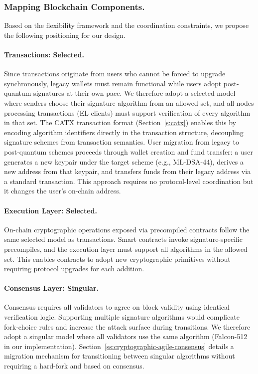 \subsubsection{Mapping Blockchain Components.}\label{subsubsec:mapping-components}

Based on the flexibility framework and the coordination constraints, we propose the following positioning for our design.

\paragraph{Transactions: Selected.}\label{para:transaction-selected}
Since transactions originate from users who cannot be forced to upgrade synchronously, legacy wallets must remain functional while users adopt post-quantum signatures at their own pace.
We therefore adopt a selected model where senders choose their signature algorithm from an allowed set, and all nodes processing transactions (EL clients) must support verification of every algorithm in that set.
The CATX transaction format (Section~\ref{s:catx}) enables this by encoding algorithm identifiers directly in the transaction structure, decoupling signature schemes from transaction semantics.
User migration from legacy to post-quantum schemes proceeds through wallet creation and fund transfer: a user generates a new keypair under the target scheme (e.g., ML-DSA-44), derives a new address from that keypair, and transfers funds from their legacy address via a standard transaction.
This approach requires no protocol-level coordination but it changes the user's on-chain address.

\paragraph{Execution Layer: Selected.}\label{para:execution-selected}
On-chain cryptographic operations exposed via precompiled contracts follow the same selected model as transactions.
Smart contracts invoke signature-specific precompiles, and the execution layer must support all algorithms in the allowed set.
This enables contracts to adopt new cryptographic primitives without requiring protocol upgrades for each addition.

\paragraph{Consensus Layer: Singular.}\label{para:consensus-singular}
Consensus requires all validators to agree on block validity using identical verification logic.
Supporting multiple signature algorithms would complicate fork-choice rules and increase the attack surface during transitions.
We therefore adopt a singular model where all validators use the same algorithm (Falcon-512~\cite{NISTPQC-R3:FALCON20} in our implementation).
Section~\ref{ss:cryptographic-agile-consensus} details a migration mechanism for transitioning between singular algorithms without requiring a hard-fork and based on consensus.

